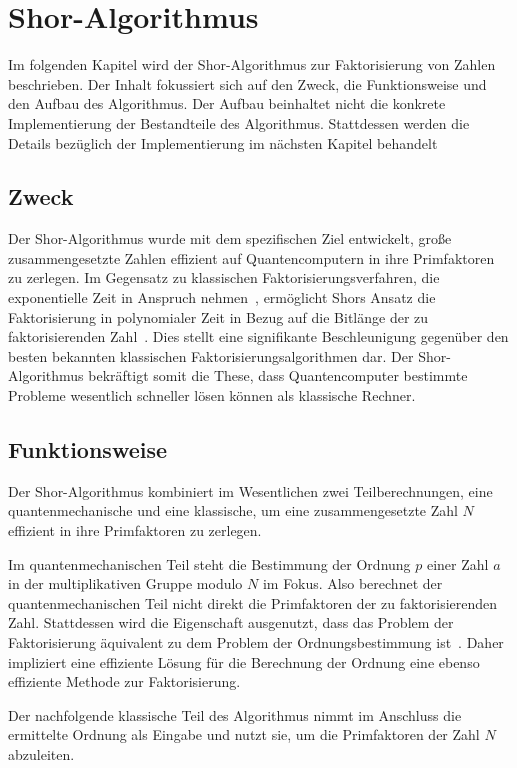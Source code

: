 \section{Shor-Algorithmus}
Im folgenden Kapitel wird der Shor-Algorithmus zur Faktorisierung von Zahlen beschrieben. 
Der Inhalt fokussiert sich auf den Zweck, die Funktionsweise und den Aufbau des Algorithmus. 
Der Aufbau beinhaltet nicht die konkrete Implementierung der Bestandteile des Algorithmus. 
Stattdessen werden die Details bezüglich der Implementierung im nächsten Kapitel behandelt

\subsection{Zweck}
Der Shor-Algorithmus wurde mit dem spezifischen Ziel entwickelt, 
große zusammengesetzte Zahlen effizient auf Quantencomputern in ihre Primfaktoren zu zerlegen. 
Im Gegensatz zu klassischen Faktorisierungsverfahren, 
die exponentielle Zeit in Anspruch nehmen~\cite{katz2023}, 
ermöglicht Shors Ansatz die Faktorisierung in polynomialer Zeit in Bezug auf die Bitlänge der zu faktorisierenden Zahl~\cite{Shor_1997}. 
Dies stellt eine signifikante Beschleunigung gegenüber den besten bekannten klassischen Faktorisierungsalgorithmen dar. 
Der Shor-Algorithmus bekräftigt somit die These, 
dass Quantencomputer bestimmte Probleme wesentlich schneller lösen können als klassische Rechner.

\subsection{Funktionsweise} \label{Funktionsweise}
Der Shor-Algorithmus kombiniert im Wesentlichen zwei Teilberechnungen, 
eine quantenmechanische und eine klassische, 
um eine zusammengesetzte Zahl \(N\) effizient in ihre Primfaktoren zu zerlegen.

Im quantenmechanischen Teil steht die Bestimmung der Ordnung \(p\) einer Zahl \(a\) 
in der multiplikativen Gruppe modulo \(N\) im Fokus. 
Also berechnet der quantenmechanischen Teil nicht direkt die Primfaktoren der zu faktorisierenden Zahl.
Stattdessen wird die Eigenschaft ausgenutzt, 
dass das Problem der Faktorisierung äquivalent zu dem Problem der Ordnungsbestimmung ist~\cite[226,633]{nielsen_chuang_2010}.
Daher impliziert eine effiziente Lösung für die Berechnung der Ordnung eine ebenso effiziente Methode zur Faktorisierung.

Der nachfolgende klassische Teil des Algorithmus nimmt im Anschluss die ermittelte Ordnung als Eingabe und nutzt sie, 
um die Primfaktoren der Zahl \(N\) abzuleiten.

